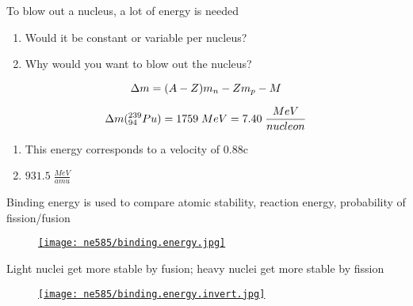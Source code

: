 \documentclass[aspectratio=1610,pdftex,dvipsnames,compress,xcolor={dvipsnames}]{beamer}
\begin{document}
\begin{frame}{To blow out a nucleus, a lot of energy is needed}
    \begin{enumerate}[series=outerlist,topsep=0pt,itemsep=21pt,leftmargin=*,label=(\arabic*)]
        \item[]Would it be constant or variable per nucleus?
        \item[]Why would you want to blow out the nucleus?
    \end{enumerate}

    \begin{equation}
        \LARGE
        \Delta m = (A-Z)m_n - Zm_p - M
    \end{equation}

    \begin{equation}
        \LARGE
        \Delta m(^{239}_{94}Pu) = 1759 \; MeV = 7.40 \; \frac{MeV}{nucleon}
    \end{equation}

    \vspace*{\fill}

    \begin{enumerate}[series=outerlist,topsep=0pt,itemsep=21pt,leftmargin=*,label=(\arabic*)]
        \item[]This energy corresponds to a velocity of 0.88c
        \item[]\LARGE $931.5 \; \frac{MeV}{amu}$
    \end{enumerate}
\end{frame}


\begin{frame}{Binding energy is used to compare atomic stability, reaction energy, probability of fission/fusion}
    \begin{figure}
        \centering
        \href{https://static.wixstatic.com/media/b89a36_1bd87fd3fe5c4d148c7a37c821c5187b~mv2.gif}{\texttt{[image: ne585/binding.energy.jpg]}}
    \end{figure}
\end{frame}


\begin{frame}{Light nuclei get more stable by fusion; heavy nuclei get more stable by fission}
    \begin{figure}
        \centering
        \href{http://ch302.cm.utexas.edu/images302/binding-energy.png}{\texttt{[image: ne585/binding.energy.invert.jpg]}}
    \end{figure}
\end{frame}
\end{document}

